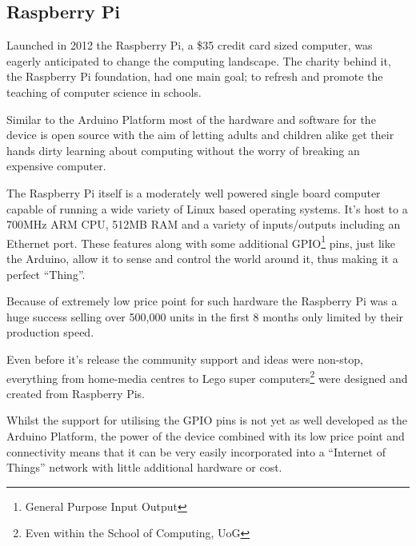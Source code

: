\documentclass{l4proj}
\begin{document}
\newpage
\subsection{Raspberry Pi} %
\label{sub:raspberry_pi}
Launched in 2012 the Raspberry Pi, a \$35 credit card sized computer, was eagerly anticipated to change the computing landscape. The charity behind it, the Raspberry Pi foundation, had one main goal; to refresh and promote the teaching of computer science in schools.

Similar to the Arduino Platform most of the hardware and software for the device is open source with the aim of letting adults and children alike get their hands dirty learning about computing without the worry of breaking an expensive computer.

The Raspberry Pi itself is a moderately well powered single board computer capable of running a wide variety of Linux based operating systems. It's host to a 700MHz ARM CPU, 512MB RAM and a variety of inputs/outputs including an Ethernet port. These features along with some additional GPIO\footnote{General Purpose Input Output} pins, just like the Arduino, allow it to sense and control the world around it, thus making it a perfect ``Thing''.

Because of extremely low price point for such hardware the Raspberry Pi was a huge success selling over 500,000 units in the first 8 months only limited by their production speed.\cite{RaspberryPiSold}

Even before it's release the community support and ideas were non-stop, everything from home-media centres\cite{Raspbmc} to Lego super computers\footnote{Even within the School of Computing, UoG}\cite{LegoSuperComputer} were designed and created from Raspberry Pis.

Whilst the support for utilising the GPIO pins is not yet as well developed as the Arduino Platform, the power of the device combined with its low price point and connectivity means that it can be very easily incorporated into a ``Internet of Things'' network with little additional hardware or cost.


\begin{comment}
new, more powerful open device. runs a real operating system with gpio options
perhaps upper limit of power for this protocol
most languages possible, threading etc
\end{comment}
\end{document}
